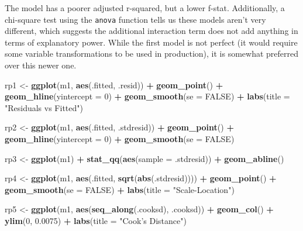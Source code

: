 \documentclass[]{article}
\newenvironment{Shaded}{\begin{snugshade}}{\end{snugshade}}
\newcommand{\KeywordTok}[1]{\textcolor[rgb]{0.13,0.29,0.53}{\textbf{#1}}}
\newcommand{\DataTypeTok}[1]{\textcolor[rgb]{0.13,0.29,0.53}{#1}}
\newcommand{\DecValTok}[1]{\textcolor[rgb]{0.00,0.00,0.81}{#1}}
\newcommand{\FloatTok}[1]{\textcolor[rgb]{0.00,0.00,0.81}{#1}}
\newcommand{\StringTok}[1]{\textcolor[rgb]{0.31,0.60,0.02}{#1}}
\newcommand{\OtherTok}[1]{\textcolor[rgb]{0.56,0.35,0.01}{#1}}
\newcommand{\OperatorTok}[1]{\textcolor[rgb]{0.81,0.36,0.00}{\textbf{#1}}}
\newcommand{\NormalTok}[1]{#1}
\begin{document}
The model has a poorer adjusted r-squared, but a lower f-stat.
Additionally, a chi-square test using the \texttt{anova} function tells
us these models aren't very different, which suggests the additional
interaction term does not add anything in terms of explanatory power.
While the first model is not perfect (it would require some variable
transformations to be used in production), it is somewhat preferred over
this newer one.

\begin{Shaded}
\begin{Highlighting}[]

\NormalTok{rp1 <-}\StringTok{ }\KeywordTok{ggplot}\NormalTok{(m1, }\KeywordTok{aes}\NormalTok{(.fitted, .resid)) }\OperatorTok{+}
\StringTok{  }\KeywordTok{geom_point}\NormalTok{() }\OperatorTok{+}
\StringTok{  }\KeywordTok{geom_hline}\NormalTok{(}\DataTypeTok{yintercept =} \DecValTok{0}\NormalTok{) }\OperatorTok{+}
\StringTok{  }\KeywordTok{geom_smooth}\NormalTok{(}\DataTypeTok{se =} \OtherTok{FALSE}\NormalTok{) }\OperatorTok{+}
\StringTok{  }\KeywordTok{labs}\NormalTok{(}\DataTypeTok{title =} \StringTok{"Residuals vs Fitted"}\NormalTok{)}

\NormalTok{rp2 <-}\StringTok{ }\KeywordTok{ggplot}\NormalTok{(m1, }\KeywordTok{aes}\NormalTok{(.fitted, .stdresid)) }\OperatorTok{+}
\StringTok{  }\KeywordTok{geom_point}\NormalTok{() }\OperatorTok{+}
\StringTok{  }\KeywordTok{geom_hline}\NormalTok{(}\DataTypeTok{yintercept =} \DecValTok{0}\NormalTok{) }\OperatorTok{+}
\StringTok{  }\KeywordTok{geom_smooth}\NormalTok{(}\DataTypeTok{se =} \OtherTok{FALSE}\NormalTok{)}

\NormalTok{rp3 <-}\StringTok{ }\KeywordTok{ggplot}\NormalTok{(m1) }\OperatorTok{+}
\StringTok{  }\KeywordTok{stat_qq}\NormalTok{(}\KeywordTok{aes}\NormalTok{(}\DataTypeTok{sample =}\NormalTok{ .stdresid)) }\OperatorTok{+}
\StringTok{  }\KeywordTok{geom_abline}\NormalTok{()}

\NormalTok{rp4 <-}\StringTok{ }\KeywordTok{ggplot}\NormalTok{(m1, }\KeywordTok{aes}\NormalTok{(.fitted, }\KeywordTok{sqrt}\NormalTok{(}\KeywordTok{abs}\NormalTok{(.stdresid)))) }\OperatorTok{+}
\StringTok{  }\KeywordTok{geom_point}\NormalTok{() }\OperatorTok{+}
\StringTok{  }\KeywordTok{geom_smooth}\NormalTok{(}\DataTypeTok{se =} \OtherTok{FALSE}\NormalTok{) }\OperatorTok{+}
\StringTok{  }\KeywordTok{labs}\NormalTok{(}\DataTypeTok{title =} \StringTok{"Scale-Location"}\NormalTok{)}

\NormalTok{rp5 <-}\StringTok{ }\KeywordTok{ggplot}\NormalTok{(m1, }\KeywordTok{aes}\NormalTok{(}\KeywordTok{seq_along}\NormalTok{(.cooksd), .cooksd)) }\OperatorTok{+}
\StringTok{  }\KeywordTok{geom_col}\NormalTok{() }\OperatorTok{+}
\StringTok{  }\KeywordTok{ylim}\NormalTok{(}\DecValTok{0}\NormalTok{, }\FloatTok{0.0075}\NormalTok{) }\OperatorTok{+}
\StringTok{  }\KeywordTok{labs}\NormalTok{(}\DataTypeTok{title =} \StringTok{"Cook's Distance"}\NormalTok{)}


\end{Highlighting}
\end{Shaded}
\end{document}
